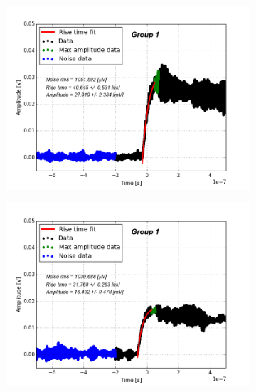 \documentclass[12pt]{article}
\begin{document}
\begin{figure}[h!!]
\begin{subfigure}[t]{0.45\textwidth}
    \includegraphics[width=1.1\textwidth]{./graphics/data_8.png}
  \end{subfigure}
  \hfill
  \begin{subfigure}[t]{0.45\textwidth}
    \centering
    \includegraphics[width=1.1\textwidth]{./graphics/data_9.png}
  \end{subfigure}
  \hfill
  \begin{subfigure}[t]{0.45\textwidth}
    \centering

\end{subfigure}
\end{figure}
\end{document}
